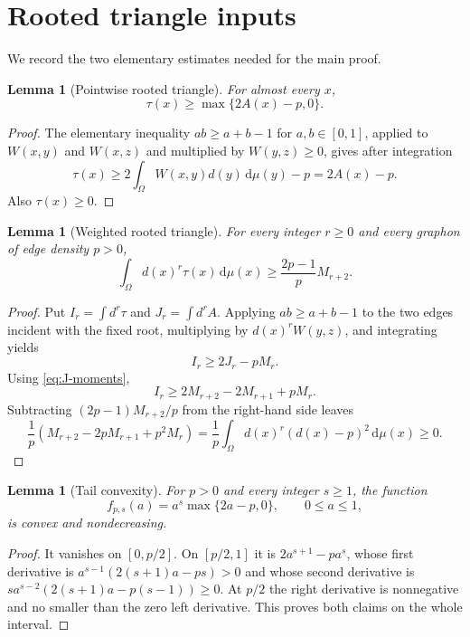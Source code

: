 \documentclass[11pt]{article}
\newtheorem{lemma}[theorem]{Lemma}
\newcommand{\dd}{\,\mathrm d}
\begin{document}
\section{Rooted triangle inputs}

We record the two elementary estimates needed for the main proof.

\begin{lemma}[Pointwise rooted triangle]
\label{lem:pointwise-triangle}
For almost every $x$,
\[
 \tau(x)\geq\max\{2A(x)-p,0\}.
\]
\end{lemma}

\begin{proof}
The elementary inequality $ab\geq a+b-1$ for $a,b\in[0,1]$, applied to
$W(x,y)$ and $W(x,z)$ and multiplied by $W(y,z)\geq0$, gives after
integration
\[
 \tau(x)\geq2\int_\Omega W(x,y)d(y)\dd\mu(y)-p=2A(x)-p.
\]
Also $\tau(x)\geq0$.
\end{proof}

\begin{lemma}[Weighted rooted triangle]
\label{lem:weighted-triangle}
For every integer $r\geq0$ and every graphon of edge density $p>0$,
\[
 \int_\Omega d(x)^r\tau(x)\dd\mu(x)
 \geq\frac{2p-1}{p}M_{r+2}.
\]
\end{lemma}

\begin{proof}
Put $I_r=\int d^r\tau$ and $J_r=\int d^rA$.  Applying
$ab\geq a+b-1$ to the two edges incident with the fixed root, multiplying
by $d(x)^rW(y,z)$, and integrating yields
\[
 I_r\geq2J_r-pM_r.
\]
Using \eqref{eq:J-moments},
\[
 I_r\geq2M_{r+2}-2M_{r+1}+pM_r.
\]
Subtracting $(2p-1)M_{r+2}/p$ from the right-hand side leaves
\[
 \frac1p\left(M_{r+2}-2pM_{r+1}+p^2M_r\right)
 =\frac1p\int_\Omega d(x)^r(d(x)-p)^2\dd\mu(x)\geq0.
\]
\end{proof}

\begin{lemma}[Tail convexity]
\label{lem:tail-convexity}
For $p>0$ and every integer $s\geq1$, the function
\[
 f_{p,s}(a)=a^s\max\{2a-p,0\},\qquad 0\leq a\leq1,
\]
is convex and nondecreasing.
\end{lemma}

\begin{proof}
It vanishes on $[0,p/2]$.  On $[p/2,1]$ it is
$2a^{s+1}-pa^s$, whose first derivative is
$a^{s-1}(2(s+1)a-ps)>0$ and whose second derivative is
$sa^{s-2}(2(s+1)a-p(s-1))\geq0$.  At $p/2$ the right derivative is
nonnegative and no smaller than the zero left derivative.  This proves both
claims on the whole interval.
\end{proof}
\end{document}
